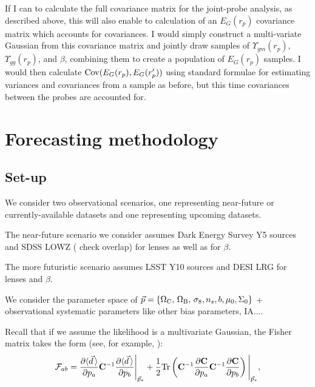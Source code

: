 \documentclass[onecolumn,amsmath,aps,fleqn, superscriptaddress]{revtex4}
\begin{document}
If I can to calculate the full covariance matrix for the joint-probe analysis, as described above, this will also enable to calculation of an $E_G(r_p)$ covariance matrix which accounts for covariances. I would simply construct a multi-variate Gaussian from this covariance matrix and jointly draw samples of $\Upsilon_{gm}(r_p)$, $\Upsilon_{gg}(r_p)$, and $\beta$, combining them to create a population of $E_G(r_p)$ samples. I would then calculate ${\rm Cov}(E_G(r_p), E_G(r_p^\prime))$ using standard formulae for estimating variances and covariances from a sample as before, but this time covariances between the probes are accounted for.

\section{Forecasting methodology}

\subsection{Set-up}
We consider two observational scenarios, one representing near-future or currently-available datasets and one representing upcoming datasets.

The near-future scenario we consider assumes Dark Energy Survey Y5 sources and SDSS LOWZ ({\color{cyan} check overlap}) for lenses as well as for $\beta$. 

The more futuristic scenario assumes LSST Y10 sources and DESI LRG for lenses and $\beta$.

We consider the parameter space of $\vec{p} = \{\Omega_{\rm C},\, \Omega_{\rm B}, \, \sigma_8, n_s, b, \mu_0, \Sigma_0\}$ {\color{cyan} + observational systematic parameters like other bias parameters, IA...}. 

Recall that if we assume the likelihood is a multivariate Gaussian, the Fisher matrix takes the form (see, for example, \cite{Bassett2011}):
\begin{equation}
\mathcal{F}_{ab} = \frac{\partial \langle \vec{d} \, \rangle}{\partial p_a} {\bf C}^{-1}  \frac{\partial \langle \vec{d} \, \rangle}{\partial p_b}\Bigg|_{\vec{p}_*} + \frac{1}{2} \mathrm{Tr}\left({\bf C}^{-1} \frac{\partial {\bf C}}{\partial p_a} {\bf C}^{-1} \frac{\partial {\bf C}}{\partial p_b} \right)\Bigg|_{\vec{p}_*},
\label{Fisher_expand}
\end{equation}


\end{document}

